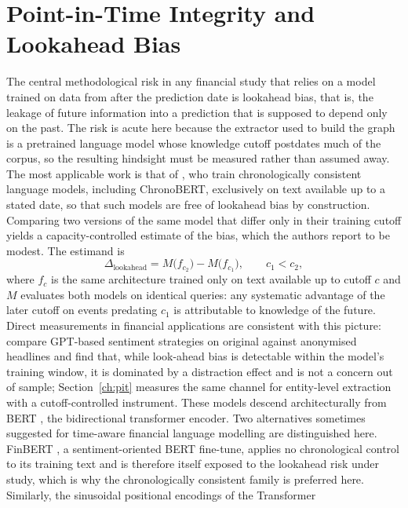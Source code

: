 \documentclass[a4paper,12pt]{report}
\begin{document}
\section{Point-in-Time Integrity and Lookahead Bias}
The central methodological risk in any financial study that relies on a model
trained on data from after the prediction date is lookahead bias, that is, the
leakage of future information into a prediction that is supposed to depend only on
the past. The risk is acute here because the extractor used to build the graph is
a pretrained language model whose knowledge cutoff postdates much of the corpus,
so the resulting hindsight must be measured rather than assumed away. The
most applicable work is that of \citet{He2025Chrono}, who train chronologically
consistent language models, including ChronoBERT, exclusively on text available
up to a stated date, so that such models are free of lookahead bias by
construction. Comparing two versions of the same model that differ only in their
training cutoff yields a capacity-controlled estimate of the bias, which the
authors report to be modest. The estimand is
\begin{equation}
\Delta_{\mathrm{lookahead}} = M\bigl(f_{c_2}\bigr) - M\bigl(f_{c_1}\bigr),
\qquad c_1 < c_2,
\label{eq:lookaheadgap}
\end{equation}
where $f_c$ is the same architecture trained only on text available up
to cutoff $c$ and $M$ evaluates both models on identical queries: any
systematic advantage of the later cutoff on events predating $c_1$ is
attributable to knowledge of the future. Direct measurements in financial
applications are consistent with this picture: \citet{GlassermanLin2023} compare
GPT-based sentiment strategies on original against anonymised headlines
and find that, while look-ahead bias is detectable within the model's
training window, it is dominated by a distraction effect and is not a
concern out of sample; Section~\ref{ch:pit} measures the same channel
for entity-level extraction with a cutoff-controlled instrument. These models descend architecturally from BERT
\citep{Devlin2019BERT}, the bidirectional transformer encoder. Two alternatives
sometimes suggested for time-aware financial language modelling are
distinguished here. FinBERT \citep{Araci2019FinBERT}, a sentiment-oriented
BERT fine-tune, applies no chronological control to its training text and is
therefore itself exposed to the lookahead risk under study, which is why the
chronologically consistent family is preferred here.
Similarly, the sinusoidal positional encodings of the Transformer \citep{Vaswani2017Attention}
\end{document}
